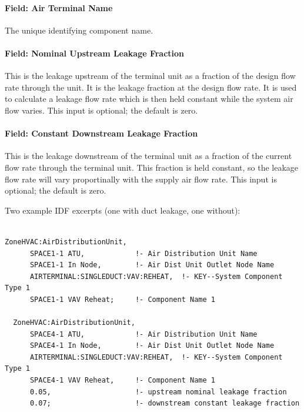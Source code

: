 \paragraph{Field: Air Terminal Name}\label{field-air-terminal-name}

The unique identifying component name.

\paragraph{Field: Nominal Upstream Leakage Fraction}\label{field-nominal-upstream-leakage-fraction}

This is the leakage upstream of the terminal unit as a fraction of the design flow rate through the unit. It is the leakage fraction at the design flow rate. It is used to calculate a leakage flow rate which is then held constant while the system air flow varies. This input is optional; the default is zero.

\paragraph{Field: Constant Downstream Leakage Fraction}\label{field-constant-downstream-leakage-fraction}

This is the leakage downstream of the terminal unit as a fraction of the current flow rate through the terminal unit. This fraction is held constant, so the leakage flow rate will vary proportinally with the supply air flow rate. This input is optional; the default is zero.

Two example IDF excerpts (one with duct leakage, one without):

\begin{lstlisting}

ZoneHVAC:AirDistributionUnit,
      SPACE1-1 ATU,            !- Air Distribution Unit Name
      SPACE1-1 In Node,        !- Air Dist Unit Outlet Node Name
      AIRTERMINAL:SINGLEDUCT:VAV:REHEAT,  !- KEY--System Component Type 1
      SPACE1-1 VAV Reheat;     !- Component Name 1

  ZoneHVAC:AirDistributionUnit,
      SPACE4-1 ATU,            !- Air Distribution Unit Name
      SPACE4-1 In Node,        !- Air Dist Unit Outlet Node Name
      AIRTERMINAL:SINGLEDUCT:VAV:REHEAT,  !- KEY--System Component Type 1
      SPACE4-1 VAV Reheat,     !- Component Name 1
      0.05,                    !- upstream nominal leakage fraction
      0.07;                    !- downstream constant leakage fraction
\end{lstlisting}

